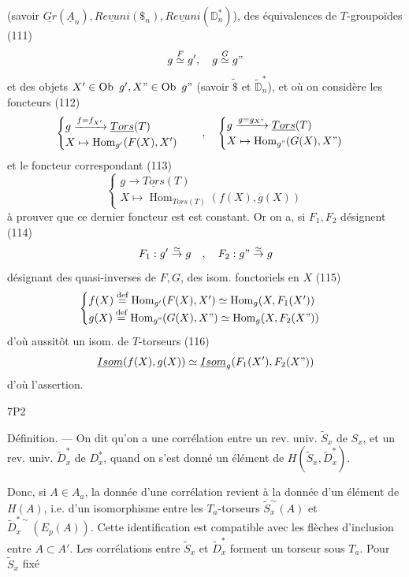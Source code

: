 
(savoir $\underline{Gr}(\underline{A}_n), \underline{Revuni}(\$_n), \underline{Revuni}(\mathbb{D}^*_n)$),
des équivalences de $T$-groupoïdes
(111) $$g \overset{F}{\simeq} g', \quad g \overset{G}{\simeq} g"$$
et des objets $X' \in \operatorname{Ob}\ g', X" \in \operatorname{Ob}\ g"$ (savoir $\tilde{\$}$ et $\tilde{\mathbb{D}}^*_n$), et où on considère les
foncteurs
(112) $$ \begin{cases} g \xrightarrow{f=f_{X'}} \underline{Tors}(T) \\ X \mapsto \operatorname{Hom}_{g'}(F(X), X') \end{cases} \quad , \quad \begin{cases} g \xrightarrow{g=g_{X"}} \underline{Tors}(T) \\ X \mapsto \operatorname{Hom}_{g"}(G(X), X") \end{cases} $$
et le foncteur correspondant
(113) $$ \begin{cases} g \xrightarrow{} \underline{Tors}(T) \\ X \mapsto \operatorname{Hom}_{\underline{Tors}(T)}(f(X), g(X)) \end{cases} $$
à prouver que ce dernier foncteur est
est constant. Or on a, si $F_1, F_2$ désignent
(114) $$ F_1 : g' \overset{\simeq}{\to} g \quad , \quad F_2 : g" \overset{\simeq}{\to} g $$
désignant des quasi-inverses de $F, G$, des
isom. fonctoriels en $X$
(115) $$ \begin{cases} f(X) \overset{\text{def}}{=} \operatorname{Hom}_{g'}(F(X), X') \simeq \operatorname{Hom}_g(X, F_1(X')) \\ g(X) \overset{\text{def}}{=} \operatorname{Hom}_{g"}(G(X), X") \simeq \operatorname{Hom}_g(X, F_2(X")) \end{cases} $$
d'où aussitôt un isom. de $T$-torseurs
(116) $$ \underline{Isom}(f(X), g(X)) \simeq \underline{Isom}_g(F_1(X'), F_2(X")) $$
d'où l'assertion.

\newpage


7P2

Définition. — On dit qu'on a une corrélation entre un rev. univ. $\tilde{S}_x$ de $S_x$, et un rev. univ. $\tilde{D}_x^*$ de $D_x^*$, quand on s'est donné un élément de $H(\tilde{S}_x, \tilde{D}_x^*)$.

Donc, si $A \in A_a$, la donnée d'une corrélation revient à la donnée d'un élément de $H(A)$, i.e. d'un isomorphisme entre les $T_a$-torseurs $\tilde{S}_x^\sim(A)$ et $\tilde{D}_x^{*\sim}(E_p(A))$. Cette identification est compatible avec les flèches d'inclusion entre $A \subset A'$. Les corrélations entre $\tilde{S}_x$ et $\tilde{D}_x^*$ forment un torseur sous $T_a$. Pour $\tilde{S}_x$ fixé

